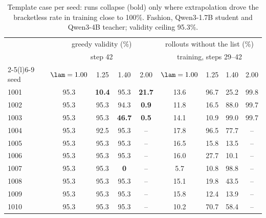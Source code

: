 \begin{table}[t]
\centering\small
\setlength{\tabcolsep}{5pt}
\begin{threeparttable}
\begin{tabular}{@{}l cccc cccc@{}}
\toprule
 & \multicolumn{4}{c}{greedy validity (\%)} & \multicolumn{4}{c}{rollouts without the list (\%)} \\
 & \multicolumn{4}{c}{step 42} & \multicolumn{4}{c}{training, steps 29--42} \\
\cmidrule(lr){2-5}\cmidrule(l){6-9}
seed & $\lam=1.00$ & 1.25 & 1.40 & 2.00 & $\lam=1.00$ & 1.25 & 1.40 & 2.00 \\
\midrule
1001 & 95.3 & \textbf{10.4} & 95.3 & \textbf{21.7} & 13.6 & 96.7 & 25.2 & 99.8 \\
1002 & 95.3 & 95.3 & 94.3 & \textbf{0.9} & 11.8 & 16.5 & 88.0 & 99.7 \\
1003 & 95.3 & 95.3 & \textbf{46.7} & \textbf{0.5} & 14.1 & 10.9 & 99.0 & 99.7 \\
1004 & 95.3 & 92.5 & 95.3 & -- & 17.8 & 96.5 & 77.7 & -- \\
1005 & 95.3 & 95.3 & 95.3 & -- & 16.5 & 15.8 & 13.5 & -- \\
1006 & 95.3 & 95.3 & 95.3 & -- & 16.0 & 27.7 & 10.1 & -- \\
1007 & 95.3 & 95.3 & \textbf{0} & -- & 5.7 & 10.8 & 98.8 & -- \\
1008 & 95.3 & 95.3 & 95.3 & -- & 15.1 & 19.8 & 43.5 & -- \\
1009 & 95.3 & 95.3 & 95.3 & -- & 15.8 & 12.4 & 13.9 & -- \\
1010 & 95.3 & 95.3 & 95.3 & -- & 10.2 & 70.7 & 58.4 & -- \\
\bottomrule
\end{tabular}
\end{threeparttable}
\caption{Template case per seed: runs collapse (bold) only where extrapolation drove the bracketless rate in training close to 100\%. Fashion, Qwen3-1.7B student and Qwen3-4B teacher; validity ceiling 95.3\%.}
\label{tab:seeds_template}
\end{table}
